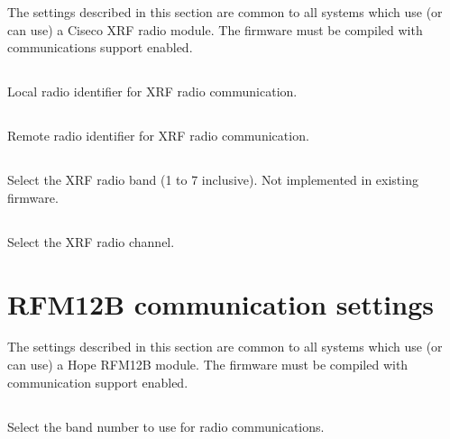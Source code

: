 The settings described in this section are common to all systems
which use (or can use) a Ciseco XRF radio module. The firmware must be
compiled with  communications support enabled.

\subsection[radio-local-id]{}

Local radio identifier for XRF radio communication.

\subsection[radio-remote-id]{}

Remote radio identifier for XRF radio communication. 

\subsection[radio-xrf-band]{}

Select the XRF radio band (1 to 7 inclusive). Not implemented in
existing firmware.

\subsection[radio-xrf-channel]{}

Select the XRF radio channel. 


\section{RFM12B communication settings}

The settings described in this section are common to all systems
which use (or can use) a Hope RFM12B module. The firmware must be
compiled with  communication support enabled.

\subsection[radio-rfm12b-band]{}

Select the band number to use for radio communications. 

\subsection[radio-rfm12b-channel]{}

